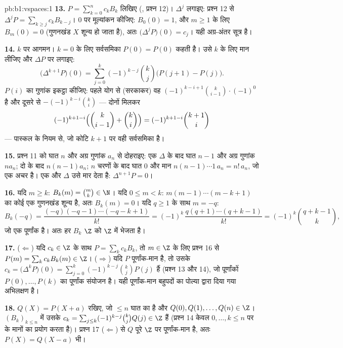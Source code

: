 \begin{solution}{pb:b1:vspaces:1}
\textbf{13.} $P = \sum_{k=0}^{n} c_k B_k$ लिखिए (, प्रश्न 12)।
$\Delta^{j}$ लगाइए: प्रश्न 12 से $\Delta^{j} P = \sum_{k \geq j} c_k
B_{k-j}$। $0$ पर मूल्यांकन कीजिए: $B_0(0) = 1$, और $m \geq 1$ के लिए $B_m(0)
= 0$ (गुणनखंड $X$ शून्य हो जाता है), अतः $\bigl(\Delta^{j}P\bigr)(0) = c_j$।
यही अग्र-अंतर सूत्र है।

\textbf{14.} $k$ पर आगमन। $k = 0$ के लिए सर्वसमिका $P(0) = P(0)$ कहती है।
उसे $k$ के लिए मान लीजिए और $\Delta P$ पर लगाइए:
\[
\bigl(\Delta^{k+1} P\bigr)(0)
= \sum_{j=0}^{k} (-1)^{k-j}\binom kj \bigl(P(j+1) - P(j)\bigr).
\]
$P(i)$ का गुणांक इकट्ठा कीजिए: पहले योग से (सरकाकर) वह $(-1)^{k-i+1}\binom
k{i-1}\cdot(-1)^{0}$ है और दूसरे से $-(-1)^{k-i}\binom ki$ --- दोनों मिलकर
\[
(-1)^{k+1-i}\Bigl(\binom k{i-1} + \binom ki\Bigr)
= (-1)^{k+1-i}\binom{k+1}i
\]
--- पास्कल के नियम से, जो कोटि $k + 1$ पर वही सर्वसमिका है।

\textbf{15.} प्रश्न 11 को घात $n$ और अग्र गुणांक $a_n$ से दोहराइए: एक
$\Delta$ के बाद घात $n-1$ और अग्र गुणांक $n a_n$; दो के बाद $n(n-1)a_n$; $n$
चरणों के बाद घात $0$ और मान $n(n-1)\cdots 1\, a_n = n!\,a_n$, जो एक अचर है।
एक और $\Delta$ उसे मार देता है: $\Delta^{n+1}P = 0$।

\textbf{16.} यदि $m \geq k$: $B_k(m) = \binom mk \in \N$। यदि $0 \leq m <
k$: $m(m-1)\cdots(m-k+1)$ का कोई एक गुणनखंड शून्य है, अतः $B_k(m) = 0$। यदि
$q \geq 1$ के साथ $m = -q$:
\[
B_k(-q) = \frac{(-q)(-q-1)\cdots(-q-k+1)}{k!}
= (-1)^k\,\frac{q(q+1)\cdots(q+k-1)}{k!}
= (-1)^k \binom{q+k-1}{k},
\]
जो एक पूर्णांक है। अतः हर $B_k$ $\Z$ को $\Z$ में भेजता है।

\textbf{17.} ($\Leftarrow$) यदि $c_k \in \Z$ के साथ $P = \sum_k c_k B_k$, तो
$m \in \Z$ के लिए प्रश्न 16 से $P(m) = \sum_k c_k B_k(m) \in \Z$।
($\Rightarrow$) यदि $P$ पूर्णांक-मान है, तो उसके  $c_k =
\bigl(\Delta^k P\bigr)(0) = \sum_{j=0}^k (-1)^{k-j}\binom kj P(j)$ हैं
(प्रश्न 13 और 14), जो पूर्णांकों $P(0), \dots, P(k)$ का पूर्णांक संयोजन है।
यही पूर्णांक-मान बहुपदों का पोल्या द्वारा दिया गया अभिलक्षण है।

\textbf{18.} $Q(X) = P(X + a)$ रखिए, जो $\leq n$ घात का  है और $Q(0),
Q(1), \dots, Q(n) \in \Z$। $(B_k)_{k \leq n}$ में उसके  $c_k =
\sum_{j \leq k}(-1)^{k-j}\binom kj Q(j) \in \Z$ हैं (प्रश्न 14 केवल $0,
\dots, k \leq n$ पर के मानों का प्रयोग करता है)। प्रश्न 17 ($\Leftarrow$) से
$Q$ पूरे $\Z$ पर पूर्णांक-मान है, अतः $P(X) = Q(X - a)$ भी।


\end{solution}

